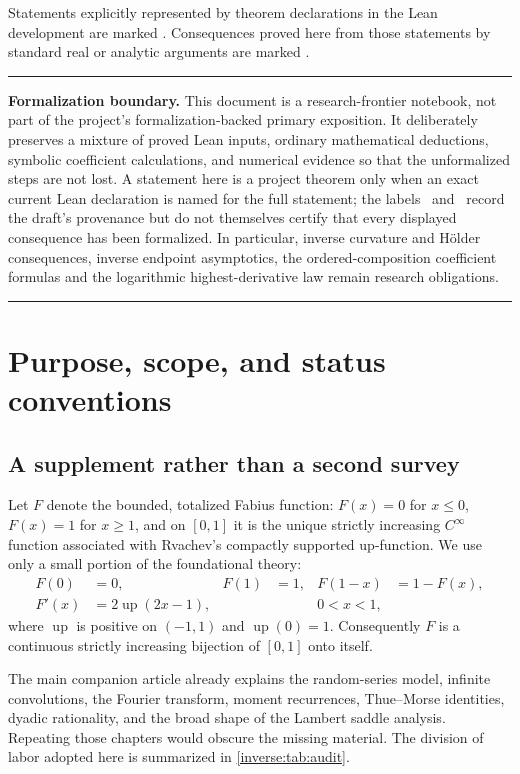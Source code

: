 \documentclass[11pt,oneside]{article}
\theoremstyle{definition}
\theoremstyle{remark}
\newcommand{\Up}{\operatorname{up}}
\newenvironment{boxedremark}{%
  \par\smallskip\noindent\begin{center}\begin{minipage}{0.94\textwidth}%
  \color{black}\hrule\vspace{0.6em}\small
}{%
  \vspace{0.6em}\hrule\end{minipage}\end{center}\smallskip
}
\begin{document}
Statements explicitly represented by theorem declarations in the Lean
development are marked \Formalized.  Consequences proved here from those
statements by standard real or analytic arguments are marked \Derived.


\begin{boxedremark}
\textbf{Formalization boundary.}
This document is a research-frontier notebook, not part of the project's
formalization-backed primary exposition.  It deliberately preserves a mixture of proved
Lean inputs, ordinary mathematical deductions, symbolic coefficient calculations, and
numerical evidence so that the unformalized steps are not lost.  A statement here is a
project theorem only when an exact current Lean declaration is named for the full statement;
the labels \Formalized\ and \Derived\ record the draft's provenance but do not themselves
certify that every displayed consequence has been formalized.  In particular, inverse
curvature and H\"older consequences, inverse endpoint asymptotics, the ordered-composition coefficient formulas and the logarithmic highest-derivative law remain research obligations.
\end{boxedremark}

\section{Purpose, scope, and status conventions}

\subsection{A supplement rather than a second survey}

Let $F$ denote the bounded, totalized Fabius function: $F(x)=0$ for
$x\leq0$, $F(x)=1$ for $x\geq1$, and on $[0,1]$ it is the unique strictly
increasing $C^\infty$ function associated with Rvachev's compactly
supported up-function.  We use only a small portion of the foundational
theory:
\begin{align}
 F(0)&=0,&F(1)&=1,&F(1-x)&=1-F(x), \label{inverse:eq:F-basic}\\
 F'(x)&=2\Up(2x-1),&&&0<x<1, \label{inverse:eq:Fprime-up}
\end{align}
where $\Up$ is positive on $(-1,1)$ and $\Up(0)=1$.  Consequently $F$ is a
continuous strictly increasing bijection of $[0,1]$ onto itself.

The main companion article already explains the random-series model,
infinite convolutions, the Fourier transform, moment recurrences,
Thue--Morse identities, dyadic rationality, and the broad shape of the
Lambert saddle analysis.  Repeating those chapters would obscure the
missing material.  The division of labor adopted here is summarized in
\cref{inverse:tab:audit}.
\end{document}
